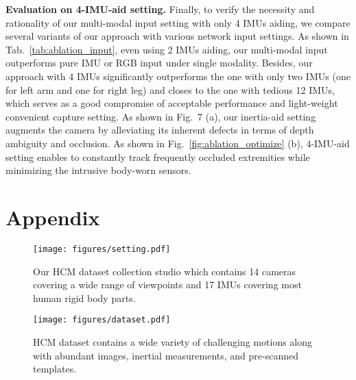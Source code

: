 \documentclass[letterpaper]{article} \usepackage{aaai23}  \usepackage{times}  \usepackage{helvet}  \usepackage{courier}  \usepackage[hyphens]{url}  \usepackage{graphicx} \urlstyle{rm} \def\UrlFont{\rm}  \usepackage{natbib}  \usepackage{caption} \frenchspacing  \setlength{\pdfpagewidth}{8.5in}  \setlength{\pdfpageheight}{11in}  \usepackage{algorithm}
\newcommand{\myparagraph}[1]{\vspace{0.1em}\noindent\textbf{#1}}
\begin{document}
\myparagraph{Evaluation on 4-IMU-aid setting.}
Finally, to verify the necessity and rationality of our multi-modal input setting with only 4 IMUs aiding, we compare several variants of our approach with various network input settings. As shown in Tab.~\ref{tab:ablation_input}, even using 2 IMUs aiding, our multi-modal input outperforms pure IMU or RGB input under single modality. Besides, our approach with 4 IMUs significantly outperforms the one with only two IMUs (one for left arm and one for right leg) and closes to the one with tedious 12 IMUs, which serves as a good compromise of acceptable performance and light-weight convenient capture setting.
As shown in Fig.~7 (a), our inertia-aid setting augments the camera by alleviating its inherent defects in terms of depth ambiguity and occlusion. As shown in Fig.~\ref{fig:ablation_optimize} (b), 4-IMU-aid setting enables to constantly track frequently occluded extremities while minimizing the intrusive body-worn sensors. 





 




\vspace{-2mm}
\section{Appendix}
\begin{figure}[h]
	\centering
	\texttt{[image: figures/setting.pdf]}
	\caption{Our HCM dataset collection studio which contains 14 cameras covering a wide range of viewpoints and 17 IMUs covering most human rigid body parts.}
	\label{fig:wear}
\end{figure}



\begin{figure*}[th]
	\centering
	\texttt{[image: figures/dataset.pdf]}
	\caption{HCM dataset contains a wide variety of challenging motions along with abundant images, inertial measurements, and pre-scanned templates.}
	\label{fig:dataset}
    \vspace{3mm}
\end{figure*}
\end{document}
